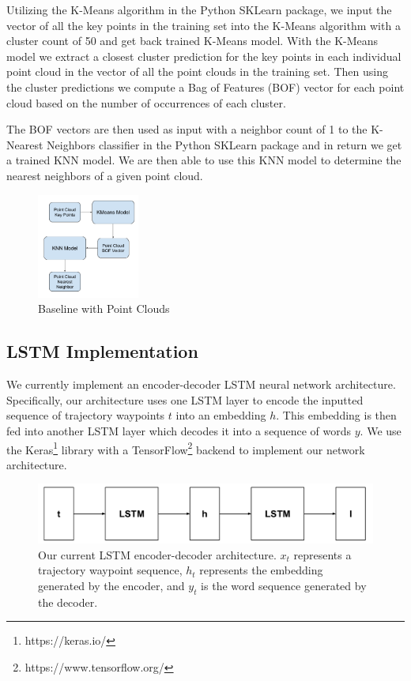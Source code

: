 \documentclass[letterpaper, 12 pt, conference]{ieeeconf}
\begin{document}
Utilizing the K-Means algorithm in the Python SKLearn package, we input the vector of all the key points in the training set into the K-Means algorithm with a cluster count of 50 and get back trained K-Means model. With the K-Means model we extract a closest cluster prediction for the key points in each individual point cloud in the vector of all the point clouds in the training set. Then using the cluster predictions we compute a Bag of Features (BOF) vector for each point cloud based on the number of occurrences of each cluster.

The BOF vectors are then used as input with a neighbor count of 1 to the K-Nearest Neighbors classifier in the Python SKLearn package and in return we get a trained KNN model. We are then able to use this KNN model to determine the nearest neighbors of a given point cloud. 


\begin{figure}[htb!]
  \centering
  \includegraphics[width=0.3\textwidth]{Baseline-[Point_Cloud]}
  \caption{Baseline with Point Clouds}
  \label{fig:Baseline_Point_Cloud}
\end{figure}

\subsection{LSTM Implementation}

We currently implement an encoder-decoder LSTM neural network architecture. Specifically, our architecture uses one LSTM layer to encode the inputted sequence of trajectory waypoints $t$ into an embedding $h$. This embedding is then fed into another LSTM layer which decodes it into a sequence of words $y$. We use the Keras\footnote{https://keras.io/} library with a TensorFlow\footnote{https://www.tensorflow.org/} backend to implement our network architecture.   

\begin{figure}[h]
\center
\includegraphics[scale=0.20]{Trajectory_LSTM}
\caption{Our current LSTM encoder-decoder architecture. $x_t$ represents a trajectory waypoint sequence, $h_t$ represents the embedding generated by the encoder, and $y_t$ is the word sequence generated by the decoder.}
\end{figure}
\end{document}

